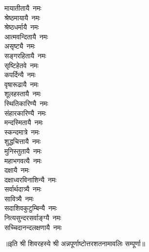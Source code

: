\begin{multicols}{2}
\begin{flushleft}
मायातीतायै~नमः\\
श्रेष्ठमायायै~नमः\\
श्रेष्ठधर्मायै~नमः\\
आत्मवन्दितायै~नमः\\
असृष्ट्यै~नमः\\
सङ्गरहितायै~नमः\hfill{}\\
सृष्टिहेतवे~नमः\\
कपर्दिन्यै~नमः\\
वृषारूढायै~नमः\\
शूलहस्तायै~नमः\\
स्थितिकारिण्यै~नमः\\
संहारकारिण्यै~नमः\\
मन्दस्मितायै~नमः\\
स्कन्दमात्रे~नमः\\
शुद्धचित्तायै~नमः\\
मुनिस्तुतायै~नमः\hfill{}\\
महाभगवत्यै~नमः\\
दक्षायै~नमः\\
दक्षाध्वरविनाशिन्यै~नमः\\
सर्वार्थदात्र्यै~नमः\\
सावित्र्यै~नमः\\
सदाशिवकुटुम्बिन्यै~नमः\\
नित्यसुन्दरसर्वाङ्ग्यै~नमः\\
सच्चिदानन्दलक्षणायै~नमः\\
\end{flushleft}
\end{multicols}
॥इति श्री शिवरहस्ये श्री अन्नपूर्णाष्टोत्तर\-शतनामावलिः सम्पूर्णा॥
